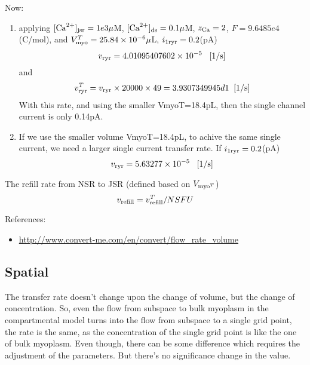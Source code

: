Now:
\begin{enumerate}
  \item  applying $[{\text{Ca}^{2+}}]_{\text{jsr}} = 1e3\mu$M, $[{\text{Ca}^{2+}}]_{\text{ds}} = 0.1\mu$M, $z_{\text{Ca}}=2$,
$F=9.6485e4$ (C/mol), and $V_{\text{myo}}^T=25.84\times 10^{-6}\mu$L,
$i_{1\text{ryr}}=0.2$(pA)
\begin{equation}
  \label{eq:47}
  v_{\text{ryr}} = 4.01095407602\times 10^{-5}  \;\;\;\text{[1/s]}
\end{equation}
and 
\begin{equation}
  \label{eq:48}
  v_{\text{ryr}}^T = v_{\text{ryr}}\times 20000\times 49 = 3.9307349945d1 \;\;\text{[1/s]}
\end{equation}
  With this rate, and using the smaller VmyoT=18.4pL, then the single channel
  current is only 0.14pA.
  
  \item If we use the smaller volume VmyoT=18.4pL, to achive the same single
  current, we need a larger single current transfer rate. If $i_{1\text{ryr}}=0.2$(pA)
\begin{equation}
  \label{eq:47}
  v_{\text{ryr}} = 5.63277\times 10^{-5}  \;\;\;\text{[1/s]}
\end{equation}

\end{enumerate}

The refill rate from NSR to JSR (defined based on $V_{\text{myo}^T}$)
\begin{equation}
v_{\text{refill}} = v_{\text{refill}}^T/NSFU
\end{equation}

References:
\begin{itemize}
  \item \url{http://www.convert-me.com/en/convert/flow_rate_volume}
\end{itemize}

\subsection{Spatial}
\label{sec:transfer_rate-spatial}

The transfer rate doesn't change upon the change of volume, but the change of
concentration. So, even the flow from subspace to bulk myoplasm in the
compartmental model turns into the flow from subspace to a single grid point,
the rate is the same, as the concentration of the single grid point is like the
one of bulk myoplasm. Even though, there can be some difference which requires
the adjustment of the parameters. But there's no significance change in the
value.

